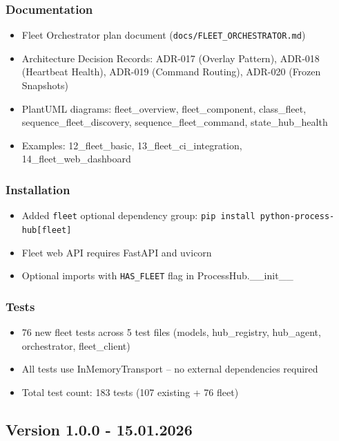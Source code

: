 \subsubsection{Documentation}

\begin{itemize}
   \item Fleet Orchestrator plan document (\texttt{docs/FLEET\_ORCHESTRATOR.md})
   \item Architecture Decision Records: ADR-017 (Overlay Pattern), ADR-018 (Heartbeat Health),
         ADR-019 (Command Routing), ADR-020 (Frozen Snapshots)
   \item PlantUML diagrams: fleet\_overview, fleet\_component, class\_fleet,
         sequence\_fleet\_discovery, sequence\_fleet\_command, state\_hub\_health
   \item Examples: 12\_fleet\_basic, 13\_fleet\_ci\_integration, 14\_fleet\_web\_dashboard
\end{itemize}

\subsubsection{Installation}

\begin{itemize}
   \item Added \texttt{fleet} optional dependency group: \texttt{pip install python-process-hub[fleet]}
   \item Fleet web API requires FastAPI and uvicorn
   \item Optional imports with \texttt{HAS\_FLEET} flag in ProcessHub.\_\_init\_\_
\end{itemize}

\subsubsection{Tests}

\begin{itemize}
   \item 76 new fleet tests across 5 test files (models, hub\_registry, hub\_agent,
         orchestrator, fleet\_client)
   \item All tests use InMemoryTransport -- no external dependencies required
   \item Total test count: 183 tests (107 existing + 76 fleet)
\end{itemize}

\subsection{Version 1.0.0 - 15.01.2026}

